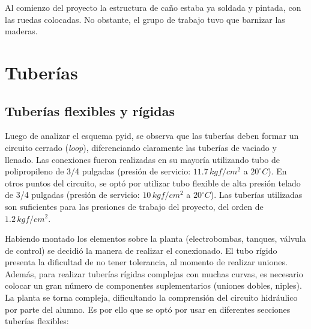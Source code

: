 Al comienzo del proyecto la estructura de caño estaba ya soldada y pintada, con
las ruedas colocadas.
No obstante, el grupo de trabajo tuvo que barnizar las maderas.

\section{Tuberías}
\label{sec:Canerias}

\subsection{Tuberías flexibles y rígidas}
Luego de analizar el esquema \gls{pyid}, se observa que las tuberías deben
formar un circuito cerrado (\emph{loop}), diferenciando
claramente las tuberías de vaciado y llenado.
Las conexiones fueron realizadas en su mayoría utilizando tubo de polipropileno
de 3/4
pulgadas (presión de servicio: $11.7\,kgf/cm^2$ a $20^\circ C$).
En otros puntos del circuito, se optó por utilizar tubo flexible de alta presión
telado de 3/4 pulgadas (presión de servicio: $10\,kgf/cm^2$ a $20^\circ C$).
Las tuberías utilizadas son suficientes para las presiones de trabajo del
proyecto, del orden de $1.2\,kgf/cm^2$.

Habiendo montado los elementos sobre la planta (electrobombas, tanques, válvula
de control) se
decidió la manera de realizar el conexionado.
El tubo rígido presenta la dificultad de no tener tolerancia, al momento de
realizar uniones.
Además, para realizar tuberías rígidas complejas con muchas curvas, es necesario
colocar un gran número de componentes suplementarios (uniones dobles,
niples).
La planta se torna compleja, dificultando la comprensión del circuito
hidráulico por parte del alumno.
Es por ello que se optó por usar en diferentes secciones tuberías flexibles:

